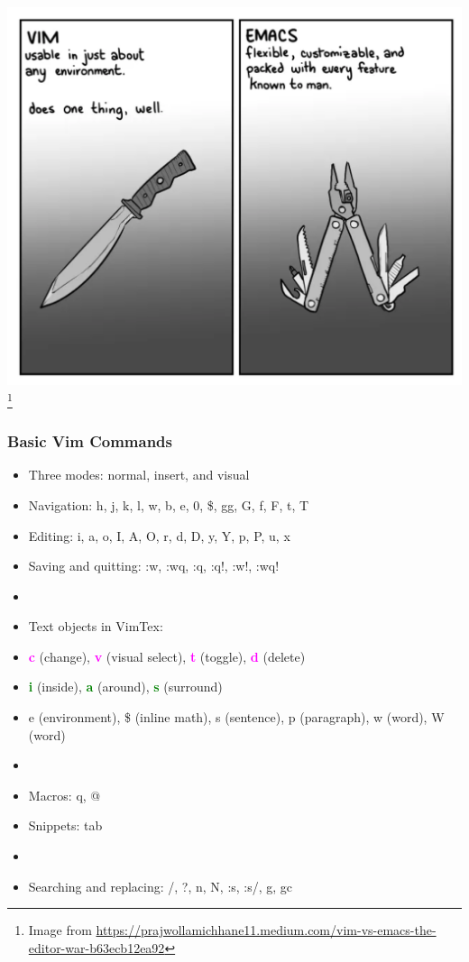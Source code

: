 \documentclass[9pt,table,xcolor=dvipsnames]{beamer}%
\theoremstyle{definition}
\theoremstyle{plain}
\begin{document}
\begin{frame}[fragile,t] %
  \includegraphics[scale=0.18]{./figs/Vim_vs_Emas.png}
  \footnote{Image from \url{https://prajwollamichhane11.medium.com/vim-vs-emacs-the-editor-war-b63ecb12ea92}}
\end{frame}
\begin{frame}
  \frametitle{Basic Vim Commands}
  \begin{itemize}
    \item Three modes: normal, insert, and visual
    \item Navigation: h, j, k, l, w, b, e, 0, \$, gg, G, f, F, t, T
    \item Editing: i, a, o, I, A, O, r, d, D, y, Y, p, P, u, x
    \item Saving and quitting: :w, :wq, :q, :q!, :w!, :wq!
    \item[]
    \item Text objects in VimTex:
    \item[] \textcolor{magenta}{\bf c} (change), \textcolor{magenta}{\bf v} (visual
      select), \textcolor{magenta}{\bf t} (toggle), \textcolor{magenta}{\bf d} (delete)
    \item[] \textcolor{green}{\bf i} (inside), \textcolor{green}{\bf a} (around),
      \textcolor{green}{\bf s} (surround)
    \item[] e (environment), \$ (inline math), s (sentence), p (paragraph), w (word), W (word)
    \item[]
    \item Macros: q, @
    \item Snippets: tab
    \item[]
    \item Searching and replacing: /, ?, n, N, :s, :s/, g, gc
  \end{itemize}
\end{frame}
\end{document}
